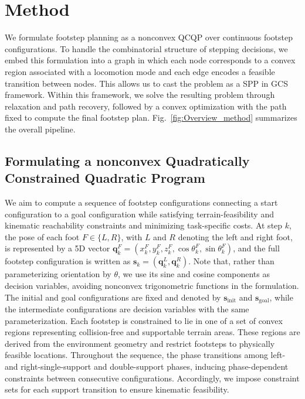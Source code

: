\documentclass[letterpaper, 10 pt, journal, twoside]{IEEEtran}
\begin{document}
\section{Method}

We formulate footstep planning as a nonconvex QCQP over continuous footstep configurations.
To handle the combinatorial structure of stepping decisions, we embed this formulation into a graph in which each node corresponds to a convex region associated with a locomotion mode and each edge encodes a feasible transition between nodes.
This allows us to cast the problem as a SPP in GCS framework.
Within this framework, we solve the resulting problem through relaxation and path recovery, followed by a convex optimization with the path fixed to compute the final footstep plan.
Fig.~\ref{fig:Overview_method} summarizes the overall pipeline.

\subsection{Formulating a nonconvex Quadratically Constrained Quadratic Program}

We aim to compute a sequence of footstep configurations connecting a start configuration to a goal configuration while satisfying terrain-feasibility and kinematic reachability constraints and minimizing task-specific costs.
At step $k$, the pose of each foot $F \in \{L,R\}$, with \(L\) and \(R\) denoting the left and right foot, is represented by a 5D vector $\mathbf{q}_k^F = (x_k^F, y_k^F, z_k^F, \cos\theta_k^F, \sin\theta_k^F)$, and the full footstep configuration is written as $\mathbf{s}_k = (\mathbf{q}_k^L, \mathbf{q}_k^R)$.
Note that, rather than parameterizing orientation by $\theta$, we use its sine and cosine components as decision variables, avoiding nonconvex trigonometric functions in the formulation.
The initial and goal configurations are fixed and denoted by $\mathbf{s}_{\text{init}}$ and $\mathbf{s}_{\text{goal}}$, while the intermediate configurations are decision variables with the same parameterization.
Each footstep is constrained to lie in one of a set of convex regions representing collision-free and supportable terrain areas.
These regions are derived from the environment geometry and restrict footsteps to physically feasible locations.
Throughout the sequence, the phase transitions among left- and right-single-support and double-support phases, inducing phase-dependent constraints between consecutive configurations.
Accordingly, we impose constraint sets for each support transition to ensure kinematic feasibility.
\end{document}
